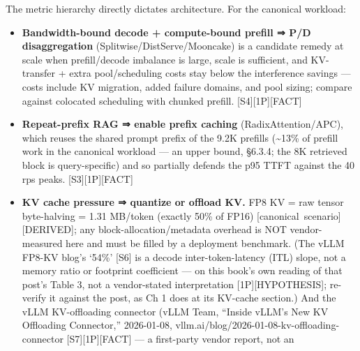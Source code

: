 \label{architecture-consequence}


The metric hierarchy directly dictates architecture. For the canonical
workload:

\begin{itemize}
\tightlist
\item
  \textbf{Bandwidth-bound decode + compute-bound prefill ⇒ P/D
  disaggregation} (Splitwise/DistServe/Mooncake) is a candidate remedy
  at scale when prefill/decode imbalance is large, scale is sufficient,
  and KV-transfer + extra pool/scheduling costs stay below the
  interference savings --- costs include KV migration, added failure
  domains, and pool sizing; compare against colocated scheduling with
  chunked prefill. \mbox{{[}S4{]}}\hspace{0pt}\mbox{{[}1P{]}}\hspace{0pt}\mbox{{[}FACT{]}}
\item
  \textbf{Repeat-prefix RAG ⇒ enable prefix caching}
  (RadixAttention/APC), which reuses the shared prompt prefix of the
  9.2K prefills (\textasciitilde13\% of prefill work in the canonical
  workload --- an upper bound, §6.3.4; the 8K retrieved block is
  query-specific) and so partially defends the p95 TTFT against the 40
  rps peaks. \mbox{{[}S3{]}}\hspace{0pt}\mbox{{[}1P{]}}\hspace{0pt}\mbox{{[}FACT{]}}
\item
  \textbf{KV cache pressure ⇒ quantize or offload KV.} FP8 KV = raw
  tensor byte-halving = 1.31 MB/token (exactly 50\% of FP16)
  \mbox{{[}canonical scenario{]}}\hspace{0pt}\mbox{{[}DERIVED{]}}; any block-allocation/metadata
  overhead is NOT vendor-measured here and must be filled by a
  deployment benchmark. (The vLLM FP8-KV blog's `54\%' \mbox{{[}S6{]}} is a
  decode inter-token-latency (ITL) slope, not a memory ratio or
  footprint coefficient --- on this book's own reading of that post's
  Table 3, not a vendor-stated interpretation \mbox{{[}1P{]}}\hspace{0pt}\mbox{{[}HYPOTHESIS{]}};
  re-verify it against the post, as Ch 1 does at its KV-cache section.)
  And the vLLM KV-offloading connector (vLLM Team, ``Inside vLLM's New
  KV Offloading Connector,'' 2026-01-08,
  vllm.ai/blog/2026-01-08-kv-offloading-connector
  \mbox{{[}S7{]}}\hspace{0pt}\mbox{{[}1P{]}}\hspace{0pt}\mbox{{[}FACT{]}} --- a first-party vendor report, not an

\end{itemize}
